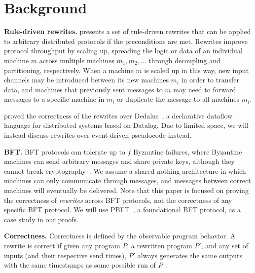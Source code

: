 \section{Background}
\label{sec:background}
\textbf{Rule-driven rewrites.}
\sigmodpaper{} presents a set of rule-driven rewrites that can be applied to arbitrary distributed protocols if the preconditions are met.
Rewrites improve protocol throughput by scaling up, spreading the logic or data of an individual machine $m$ across multiple machines $m_1, m_2, \ldots$ through decoupling and partitioning, respectively.
When a machine $m$ is scaled up in this way, new input channels may be introduced between its new machines $m_i$ in order to transfer data, and machines that previously sent messages to $m$ may need to forward messages to a specific machine in $m_i$ or duplicate the message to all machines $\overline{m_i}$.

\sigmodpaper{} proved the correctness of the rewrites over Dedalus~\cite{dedalus}, a declarative dataflow language for distributed systems based on Datalog.
Due to limited space, we will instead discuss rewrites over event-driven pseudocode instead.

\textbf{BFT.}
BFT protocols can tolerate up to $f$ Byzantine failures, where Byzantine machines can send arbitrary messages and share private keys, although they cannot break cryptography~\cite{pbft}.
We assume a shared-nothing architecture in which machines can only communicate through messages, and messages between correct machines will eventually be delivered.
Note that this paper is focused on proving the correctness of \emph{rewrites} across BFT protocols, not the correctness of any specific BFT protocol.
We will use PBFT~\cite{pbft}, a foundational BFT protocol, as a case study in our proofs.

\textbf{Correctness.}
Correctness is defined by the observable program behavior.
A rewrite is correct if given any program $P$, a rewritten program $P'$, and any set of inputs (and their respective send times), $P'$ always generates the same outputs with the same timestamps as some possible run of $P$~\cite{autocomp}.

